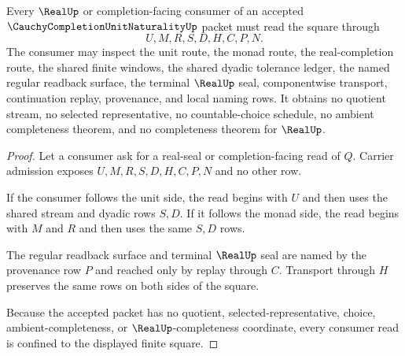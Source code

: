 \begin{theorem}
\label{thm:cauchy-completion-unit-naturality-real-seal-consumer}
Every $\RealUp$ or completion-facing consumer of an accepted $\CauchyCompletionUnitNaturalityUp$ packet must read the square through
$$
U,M,R,S,D,H,C,P,N .
$$
The consumer may inspect the unit route, the monad route, the real-completion route, the shared finite windows, the shared dyadic tolerance ledger, the named regular readback surface, the terminal $\RealUp$ seal, componentwise transport, continuation replay, provenance, and local naming rows. It obtains no quotient stream, no selected representative, no countable-choice schedule, no ambient completeness theorem, and no completeness theorem for $\RealUp$.
\end{theorem}
\begin{proof}
Let a consumer ask for a real-seal or completion-facing read of $Q$. Carrier admission exposes $U,M,R,S,D,H,C,P,N$ and no other row.

If the consumer follows the unit side, the read begins with $U$ and then uses the shared stream and dyadic rows $S,D$. If it follows the monad side, the read begins with $M$ and $R$ and then uses the same $S,D$ rows.

The regular readback surface and terminal $\RealUp$ seal are named by the provenance row $P$ and reached only by replay through $C$. Transport through $H$ preserves the same rows on both sides of the square.

Because the accepted packet has no quotient, selected-representative, choice, ambient-completeness, or $\RealUp$-completeness coordinate, every consumer read is confined to the displayed finite square.
\end{proof}

\begin{closurestatus}{\CauchyCompletionUnitNaturalityUp}
  \theoryclosure{\seedClosure}
  \formalstatus{\unformalizedV}
\end{closurestatus}
